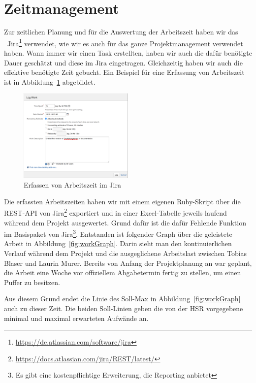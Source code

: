 \chapter*{Zeitmanagement}
	Zur zeitlichen Planung und für die Auswertung der Arbeitszeit haben wir das \ppt\ Jira\footnote{\url{https://de.atlassian.com/software/jira}} verwendet,
	wie wir es auch für das ganze Projektmanagement verwendet haben.
	Wann immer wir einen Task erstellten, haben wir auch die dafür benötigte Dauer geschätzt
	und diese im Jira eingetragen.
	Gleichzeitig haben wir auch die effektive benötigte Zeit gebucht.
	Ein Beispiel für eine Erfassung von Arbeitszeit ist in Abbildung\ \ref{fig:logWork} abgebildet.
	
	\begin{figure}[H]
		\includegraphics[width=0.5\textwidth]{projectPlan/media/img/logWork.png}
		\centering
		\caption{Erfassen von Arbeitszeit im Jira}
		\label{fig:logWork}
	\end{figure}
	
	Die erfassten Arbeitszeiten haben wir mit einem eigenen Ruby-Skript über die REST-API von Jira\footnote{\url{https://docs.atlassian.com/jira/REST/latest/}} exportiert
	und in einer Excel-Tabelle jeweils laufend während dem Projekt ausgewertet.
	Grund dafür ist die dafür Fehlende Funktion im Basispaket von Jira\footnote{Es gibt eine kostenpflichtige Erweiterung, die Reporting anbietet}.
	Entstanden ist folgender Graph über die geleistete Arbeit in Abbildung\ \ref{fig:workGraph}.
	Darin sieht man den kontinuierlichen Verlauf während dem Projekt
	und die ausgeglichene Arbeitslast zwischen Tobias Blaser und Laurin Murer.
	Bereits von Anfang der Projektplanung an war geplant, die Arbeit eine Woche vor offiziellem Abgabetermin fertig zu stellen, um einen Puffer zu besitzen.
	
	Aus diesem Grund endet die Linie des Soll-Max in Abbildung\ \ref{fig:workGraph} auch zu dieser Zeit.
	Die beiden Soll-Linien geben die von der HSR vorgegebene minimal und maximal erwarteten Aufwände an.
	
